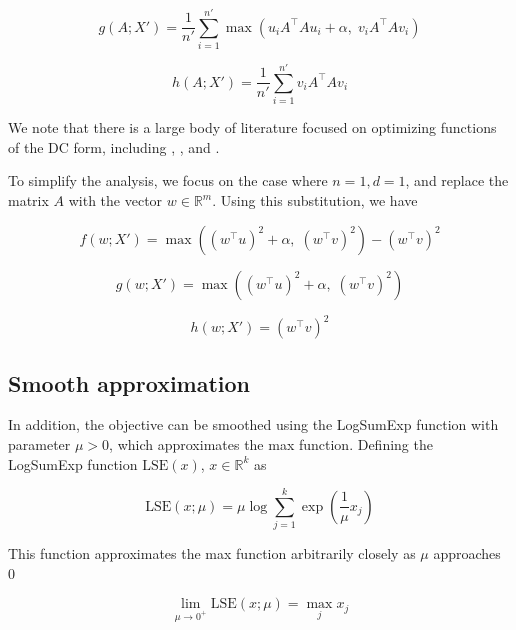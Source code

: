 \documentclass[11pt]{article}
\begin{document}
\begin{equation}
    g(A; X') = \frac{1}{n'} \sum_{i=1}^{n'} \max(u_i A^{\top}Au_i + \alpha, \; v_i A^{\top}A v_i)
\end{equation}

\begin{equation}
    h(A; X') = \frac{1}{n'} \sum_{i=1}^{n'} v_i A^{\top}A v_i
\end{equation}

We note that there is a large body of literature focused on optimizing functions of the DC form, including \cite{an_dc_2005}, \cite{lipp_variations_2016}, and \cite{khamaru_convergence_2018}.

To simplify the analysis, we focus on the case where $n = 1, d = 1$, and replace the matrix $A$ with the vector $w \in \mathbb{R}^m$. Using this substitution, we have

\begin{equation}
\label{eq:full_orig_margin_f}
    f(w; X') = \max((w^{\top} u)^2 + \alpha, \; (w^{\top} v)^2) - (w^{\top} v)^2
\end{equation}

\begin{equation}
    g(w; X') = \max((w^{\top} u)^2 + \alpha, \; (w^{\top} v)^2)
\end{equation}

\begin{equation}
    h(w; X') = (w^{\top} v)^2
\end{equation}

\subsection{Smooth approximation}

In addition, the objective can be smoothed using the LogSumExp function with parameter $\mu > 0$, which approximates the max function. Defining the LogSumExp function $\textrm{LSE}(x)$, $x \in \mathbb{R}^k$ as

\begin{equation}
    \textrm{LSE}(x; \mu) = \mu \log \sum_{j=1}^{k} \exp(\frac{1}{\mu}x_j)
\end{equation}

This function approximates the max function arbitrarily closely as $\mu$ approaches $0$

\begin{equation}
    \lim_{\mu \to 0^+}  \textrm{LSE}(x; \mu) = \max_j x_j
\end{equation}
\end{document}
